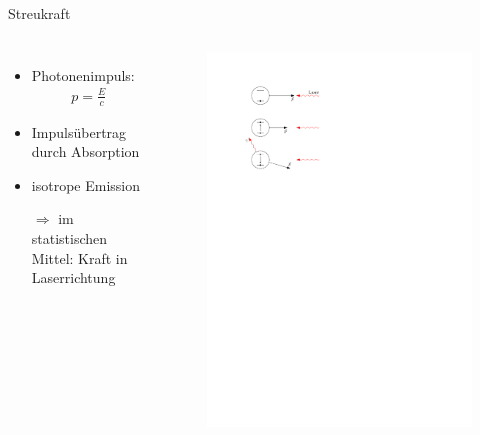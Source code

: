 \documentclass[12pt,xcolor=dvipsnames]{beamer}
\begin{document}
\begin{frame}{Streukraft}
	\begin{columns}[c]
		\begin{itemize}
			\setlength\itemsep{1em}
			\item Photonenimpuls:
			\begin{align*}
				p = \frac{E}{c}
			\end{align*}
			\item Impulsübertrag durch Absorption
			
			\item isotrope Emission
			
			\item[$\Rightarrow$] im statistischen Mittel: Kraft in Laserrichtung
		\end{itemize}
		
		\begin{figure}[h]
			\centering
			\vspace{-1cm}
			\includegraphics[width=1.0\textwidth]{./figures/streukraft.pdf}
		\end{figure}
		
	\end{columns}

\end{frame}
\end{document}
